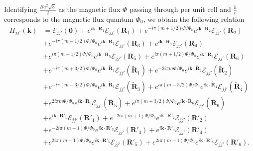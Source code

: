 Identifying $\frac{B a^{2} \sqrt{3}}{2}$ as the magnetic flux $\Phi$ passing through per unit cell and $\frac{h}{e}$ corresponds to the magnetic flux quantum $\Phi_{0}$, we obtain the following relation
\begin{equation}
	\begin{aligned}
		H_{jj'}(\mathbf{k})
		& = \mathcal{E}_{jj'}(\mathbf{0}) + e^{i \mathbf{k} \cdot \mathbf{R}_{1}} \mathcal{E}_{jj'}(\mathbf{R}_{1}) + e^{-i\pi(m + 1/2)\Phi / \Phi_{0}} e^{i \mathbf{k} \cdot \mathbf{R}_{2}} \mathcal{E}_{jj'}(\mathbf{R}_{2})  \\
		& + e^{-i\pi(m - 1/2)\Phi / \Phi_{0}} e^{i \mathbf{k} \cdot \mathbf{R}_{3}} \mathcal{E}_{jj'}(\mathbf{R}_{3}) + e^{i \mathbf{k} \cdot \mathbf{R}_{4}} \mathcal{E}_{jj'}(\mathbf{R}_{4})                                  \\
		& + e^{i\pi(m - 1/2)\Phi / \Phi_{0}} e^{i \mathbf{k} \cdot \mathbf{R}_{5}} \mathcal{E}_{jj'}(\mathbf{R}_{5}) + e^{i\pi(m + 1/2)\Phi / \Phi_{0}} e^{i \mathbf{k} \cdot \mathbf{R}_{6}} \mathcal{E}_{jj'}(\mathbf{R}_{6}) \\
		& + e^{- i\pi(m + 3/2)\Phi/\Phi_{0} } e^{i \mathbf{k} \cdot \tilde{\mathbf{R}}_{1}} \mathcal{E}_{jj'}(\tilde{\mathbf{R}}_{1}) + e^{- 2i\pi m\Phi/\Phi_{0} } e^{i \mathbf{k} \cdot \tilde{\mathbf{R}}_{2}} \mathcal{E}_{jj'}(\tilde{\mathbf{R}}_{2}) \\
		& + e^{- i\pi(m - 3/2)\Phi/\Phi_{0} } e^{i \mathbf{k} \cdot \tilde{\mathbf{R}}_{3}} \mathcal{E}_{jj'}(\tilde{\mathbf{R}}_{3}) + e^{ i\pi (m-3/2)\Phi/\Phi_{0} } e^{i \mathbf{k} \cdot \tilde{\mathbf{R}}_{4}} \mathcal{E}_{jj'}(\tilde{\mathbf{R}}_{4}) \\
		& + e^{2 i\pi m \Phi/\Phi_{0} } e^{i \mathbf{k} \cdot \tilde{\mathbf{R}}_{5}} \mathcal{E}_{jj'}(\tilde{\mathbf{R}}_{5}) + e^{ i\pi (m+3/2)\Phi/\Phi_{0} } e^{i \mathbf{k} \cdot \tilde{\mathbf{R}}_{6}} \mathcal{E}_{jj'}(\tilde{\mathbf{R}}_{6}) \\
		& + e^{i \mathbf{k} \cdot \mathbf{R}'_{1}} \mathcal{E}_{jj'}(\mathbf{R}'_{1}) + e^{-2i\pi(m + 1)\Phi / \Phi_{0}} e^{i \mathbf{k} \cdot \mathbf{R}'_{2}} \mathcal{E}_{jj'}(\mathbf{R}'_{2})  \\
		& + e^{-2i\pi(m - 1)\Phi / \Phi_{0}} e^{i \mathbf{k} \cdot \mathbf{R}'_{3}} \mathcal{E}_{jj'}(\mathbf{R}'_{3}) + e^{i \mathbf{k} \cdot \mathbf{R}'_{4}} \mathcal{E}_{jj'}(\mathbf{R}'_{4})                                  \\
		& + e^{2i\pi(m - 1)\Phi / \Phi_{0}} e^{i \mathbf{k} \cdot \mathbf{R}'_{5}} \mathcal{E}_{jj'}(\mathbf{R}'_{5}) + e^{2i\pi(m + 1)\Phi / \Phi_{0}} e^{i \mathbf{k} \cdot \mathbf{R}'_{6}} \mathcal{E}_{jj'}(\mathbf{R}'_{6}).
	\end{aligned}
\end{equation}

